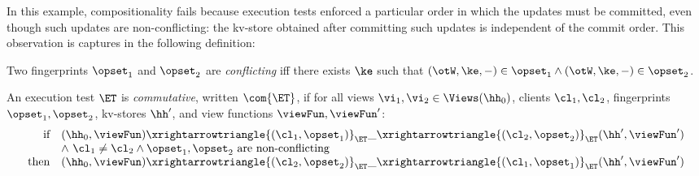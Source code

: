 In this example, compositionality fails because execution tests 
enforced a particular order in which the updates must be committed, even though such updates 
are non-conflicting: \ie the kv-store obtained after committing such updates is independent of the commit order. This observation is captures in the following definition: 
\begin{definition}
Two fingerprints $\opset_1$ and $\opset_2$ are \emph{conflicting} 
iff there exists $\ke$ such that 
$(\otW, \ke, -) \in \opset_1 \land (\otW, \ke, -) \in \opset_2$. 

An execution test $\ET$ is \emph{commutative}, written $\com{\ET}$, if 
for all views $\vi_1, \vi_2 \in \Views(\hh_0)$, 
clients $\cl_1, \cl_2$,
fingerprints $\opset_1, \opset_2$, 
kv-stores $\hh'$,
and view functions $\viewFun, \viewFun'$:
\[
\begin{array}{@{}r @{\hspace{10pt}} l @{}}
	\text{if} &  
	(\hh_0, \viewFun) \xrightarrowtriangle{(\cl_1, \opset_1)}_{\ET} 
	\_ \xrightarrowtriangle{(\cl_2, \opset_2)}_{\ET} (\hh', \viewFun') \\
	& \land\ \cl_1 \ne \cl_2 \land \opset_1, \opset_2  \text{ are non-conflicting}\\
%
%	
	\text{then} & (\hh_0, \viewFun) \xrightarrowtriangle{(\cl_2, \opset_2)}_{\ET} 
\_ \xrightarrowtriangle{(\cl_1, \opset_1)}_{\ET} (\hh', \viewFun')
\end{array}
\]
\end{definition}

